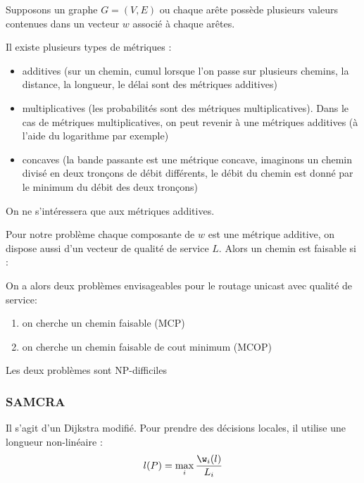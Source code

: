 \documentclass[a4paper,11pt]{thesis}
\begin{document}
Supposons un graphe $G=(V,E)$ ou chaque arête possède plusieurs valeurs contenues dans un vecteur
$w$ associé à chaque arêtes.

Il existe plusieurs types de métriques : \begin{itemize}
    \item additives (sur un chemin, cumul lorsque l'on passe sur plusieurs chemins, la distance, la
        longueur, le délai sont des métriques additives)
    \item multiplicatives (les probabilités sont des métriques multiplicatives). Dans le cas de
        métriques multiplicatives, on peut revenir à une métriques additives (à l'aide du logarithme
        par exemple)
    \item concaves (la bande passante est une métrique concave, imaginons un chemin divisé en deux
        tronçons de débit différents, le débit du chemin est donné par le minimum du débit des deux
        tronçons)
\end{itemize}

On ne s'intéressera que aux métriques additives.

Pour notre problème chaque composante de $w$ est une métrique additive, on dispose aussi d'un
vecteur de qualité de service $L$. Alors un chemin est faisable si :

On a alors deux problèmes envisageables pour le routage unicast avec qualité de service:
\begin{enumerate}
    \item on cherche un chemin faisable (MCP)
    \item on cherche un chemin faisable de cout minimum (MCOP)
\end{enumerate}

\begin{prop}
    Les deux problèmes sont NP-difficiles
\end{prop}

\subsubsection{SAMCRA}

Il s'agit d'un Dijkstra modifié. Pour prendre des décisions locales, il utilise une longueur
non-linéaire : \begin{displaymath}
    l(P) = \max_i \frac{\w_i(l)}{L_i}
\end{displaymath}
\end{document}
